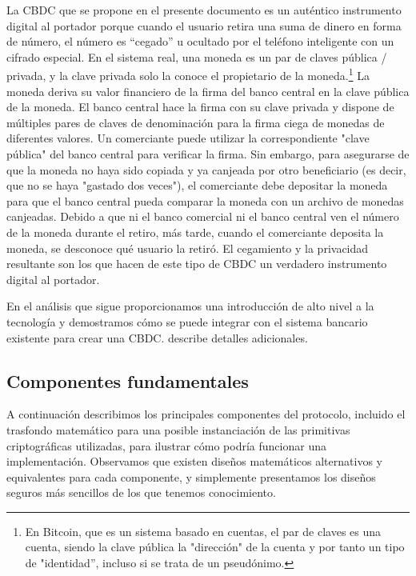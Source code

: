 \documentclass[10pt,spanish]{article}
\begin{document}
La CBDC que se propone en el presente documento es un auténtico
instrumento digital al portador porque cuando el usuario retira una suma
de dinero en forma de número, el número es ``cegado'' u ocultado por el
teléfono inteligente con un cifrado especial. En el sistema real, una
moneda es un par de claves pública / privada, y la clave privada solo la
conoce el propietario de la moneda.\footnote{En Bitcoin, que es un
sistema basado en cuentas, el par de claves es una cuenta, siendo la
clave pública la "dirección" de la cuenta y por tanto un tipo de
"identidad'', incluso si se trata de un pseudónimo.} La moneda deriva
su valor financiero de la firma del banco central en la clave pública de
la moneda. El banco central hace la firma con su clave privada y dispone
de múltiples pares de claves de denominación para la firma ciega de
monedas de diferentes valores. Un comerciante puede utilizar la
correspondiente "clave pública" del banco central para verificar la
firma. Sin embargo, para asegurarse de que la moneda no haya sido
copiada y ya canjeada por otro beneficiario (es decir, que no se haya
"gastado dos veces"), el comerciante debe depositar la moneda para que
el banco central pueda comparar la moneda con un archivo de monedas
canjeadas. Debido a que ni el banco comercial ni el banco central ven el
número de la moneda durante el retiro, más tarde, cuando el comerciante
deposita la moneda, se desconoce qué usuario la retiró. El cegamiento y
la privacidad resultante son los que hacen de este tipo de CBDC un
verdadero instrumento digital al portador.

En el análisis que sigue proporcionamos una introducción de alto nivel a
la tecnología y demostramos cómo se puede integrar con el sistema
bancario existente para crear una CBDC. \citet{Dold} describe detalles
adicionales.

\hypertarget{componentes-fundamentales}{%
\subsection{Componentes fundamentales}\label{componentes-fundamentales}}

A continuación describimos los principales componentes del protocolo,
incluido el trasfondo matemático para una posible instanciación de las
primitivas criptográficas utilizadas, para ilustrar cómo podría
funcionar una implementación. Observamos que existen diseños matemáticos
alternativos y equivalentes para cada componente, y simplemente
presentamos los diseños seguros más sencillos de los que tenemos
conocimiento.
\end{document}

